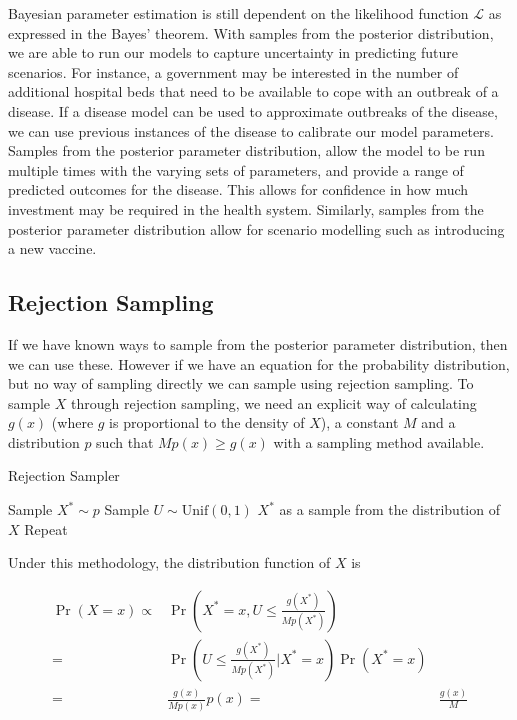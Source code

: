 Bayesian parameter estimation is still dependent on the likelihood function
$\mathcal{L}$ as expressed in the Bayes' theorem.
With samples from the posterior distribution, we are
able to run our models to capture uncertainty in predicting future scenarios.
For instance, a government may be interested in the number of additional
hospital beds that need to be available to cope with an outbreak of a disease.
If a disease model can be used to approximate outbreaks of the disease,
we can use previous instances of the disease to calibrate our model parameters.
Samples from the posterior parameter distribution, allow
the model to be run multiple times with the varying sets of parameters,
and provide a range of predicted outcomes for the disease. This allows for
confidence in how much investment may be required in the health system.
Similarly, samples from the posterior parameter distribution allow for scenario
modelling such as introducing a new vaccine.

\subsection*{Rejection Sampling}

If we have known ways to sample from the posterior parameter distribution,
then we can use these. However if we have an equation for the probability
distribution, but no way of sampling directly we can sample using rejection
sampling. To sample $X$ through rejection sampling,
we need an explicit way of calculating
$g(x)$ (where $g$ is proportional to the density of $X$), a constant $M$ and
a distribution $p$ such that $Mp(x) \geq g(x)$ with a sampling method
available.

\begin{algorithm}[htbp]
    \caption{Rejection Sampler}
    \label{alg:rej_samp}
    \begin{algorithmic}[1]
        \State Sample $X^\ast \sim p$
        \State Sample $U \sim \mathrm{Unif}(0, 1)$
        \State \Return $X^\ast$ as a sample from the distribution of $X$
        \Else
        \State Repeat
        \EndIf
    \end{algorithmic}
\end{algorithm}

Under this methodology, the distribution function of $X$ is

\begin{align*}
    \Pr(X = x)
    \propto & \Pr(X^\ast = x , U \leq \frac{g(X^\ast)}{M p(X^\ast)})
    \tag*{where the probabilities may be interpreted as densities}                   \\
    =       & \Pr(U \leq \frac{g(X^\ast)}{M p(X^\ast)} | X^\ast = x) \Pr(X^\ast = x) \\
    =       & \frac{g(x)}{M p(x)} p(x)
    =       & \frac{g(x)}{M}
\end{align*}


